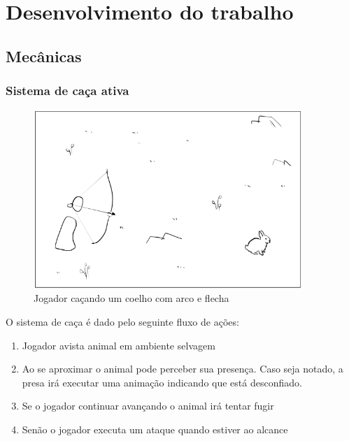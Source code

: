 \documentclass[12pt, 
openright, 
oneside, 
a4paper,    
brazil]{facom-ufu-abntex2}
\begin{document}
\chapter{Desenvolvimento do trabalho}
\label{sec:desenv}
\section{Mecânicas}
\subsection{Sistema de caça ativa}
\begin{figure}[H]
	\centering
	\includegraphics[width=4in]{imagens/mecanica_caca.png}
	\caption{Jogador caçando um coelho com arco e flecha}
\end{figure}
O sistema de caça é dado pelo seguinte fluxo de ações:
\begin{enumerate}  
\item Jogador avista animal em ambiente selvagem 
\item Ao se aproximar o animal pode perceber sua presença. Caso seja notado, a presa irá executar uma animação indicando que está desconfiado.
\item Se o jogador continuar avançando o animal irá tentar fugir 
\item Senão o jogador executa um ataque quando estiver ao alcance 
\end{enumerate}
\end{document}
